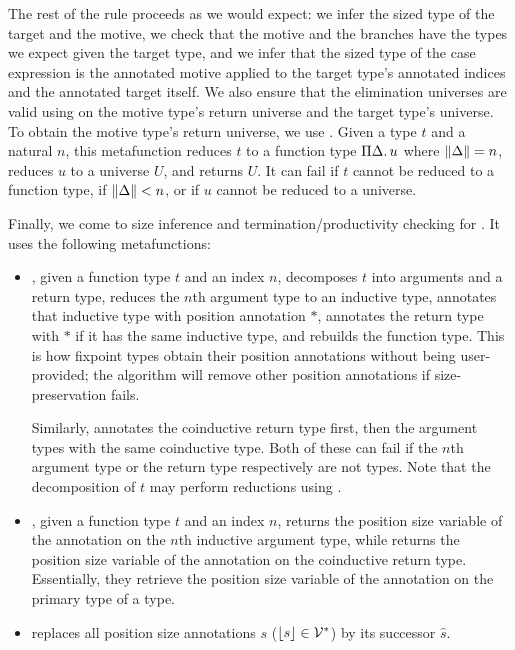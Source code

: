 The rest of the rule proceeds as we would expect: we infer the sized type of the target and the motive, we check that the motive and the branches have the types we expect given the target type, and we infer that the sized type of the case expression is the annotated motive applied to the target type's annotated indices and the annotated target itself.
We also ensure that the elimination universes are valid using \elim on the motive type's return universe and the target type's universe.
To obtain the motive type's return universe, we use \decompose.
Given a type $t$ and a natural $n$, this metafunction reduces $t$ to a function type $\Pi \Delta \mathpunct{.} u$ where $\lVert\Delta\rVert = n$, reduces $u$ to a universe $U$, and returns $U$.
It can fail if $t$ cannot be reduced to a function type, if $\lVert\Delta\rVert < n$, or if $u$ cannot be reduced to a universe.

Finally, we come to size inference and termination/productivity checking for \cofixpoints.
It uses the following metafunctions:
\begin{itemize}
  \item \setrecstars, given a function type $t$ and an index $n$, decomposes $t$ into arguments and a return type, reduces the $n$th argument type to an inductive type, annotates that inductive type with position annotation $*$, annotates the return type with $*$ if it has the same inductive type, and rebuilds the function type.
    This is how fixpoint types obtain their position annotations without being user-provided; the algorithm will remove other position annotations if size-preservation fails.
    
    Similarly, \setcorecstars annotates the coinductive return type first, then the argument types with the same coinductive type.
    Both of these can fail if the $n$th argument type or the return type respectively are not \coinductive types.
    Note that the decomposition of $t$ may perform reductions using \whnf.
  \item \getrecvar, given a function type $t$ and an index $n$, returns the position size variable of the annotation on the $n$th inductive argument type, while \getcorecvar returns the position size variable of the annotation on the coinductive return type.
    Essentially, they retrieve the position size variable of the annotation on the primary \corecursive type of a \cofixpoint type.
  \item \shift replaces all position size annotations $s$ (\ie $\lfloor s\rfloor \in \mathcal{V}^*$) by its successor $\hat{s}$.
\end{itemize}

